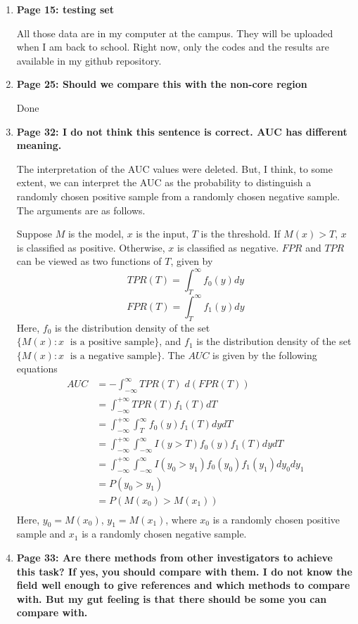 \documentclass[11pt]{article}
\begin{document}
\begin{enumerate}
\item \textbf{Page 15: testing set}

All those data are in my computer at the campus. They will be uploaded when I am back to school. Right now, only the codes and the results are available in my github repository.

\item \textbf{Page 25: Should we compare this with the non-core region}

 Done
 
\item \textbf{Page 32: I do not think this sentence is correct. AUC has different meaning.}

The interpretation of the AUC values were deleted. But, I think, to some extent, we can interpret the AUC as the probability to distinguish a randomly chosen positive sample from a randomly chosen negative sample. The arguments are as follows.

Suppose $M$ is the model, $x$ is the input, $T$ is the threshold. If $M(x)>T$, $x$ is classified as positive. Otherwise, $x$ is classified as negative. $FPR$ and $TPR$ can be viewed as two functions of $T$, given by 
$$TPR(T)=\int_{T}^{\infty}f_0(y)dy$$
$$FPR(T)=\int_{T}^{\infty}f_1(y)dy$$
Here, $f_0$ is the distribution density of the set $\{M(x): x\; \text{ is a positive sample}\}$, and $f_1$ is the distribution density of the set $\{M(x): x\; \text{ is a negative sample}\}$.
The $AUC$ is given by the following equations
\begin{align*}
AUC &= -\int_{-\infty}^{\infty}TPR(T)\; d(FPR(T))\\
	&= \int_{-\infty}^{+\infty}TPR(T)f_1(T)dT\\
	&= \int_{-\infty}^{+\infty}\int_{T}^{\infty}f_0(y)f_1(T)dydT\\
	&= \int_{-\infty}^{+\infty}\int_{-\infty}^{\infty}I(y>T)f_0(y)f_1(T)dydT\\
	&= \int_{-\infty}^{+\infty}\int_{-\infty}^{\infty}I(y_0>y_1)f_0(y_0)f_1(y_1)dy_0dy_1\\
	&= P(y_0>y_1)\\
	&= P(M(x_0)>M(x_1))\\
\end{align*}
Here, $y_0=M(x_0)$, $y_1=M(x_1)$, where $x_0$ is a randomly chosen positive sample and $x_1$ is a randomly chosen negative sample. 

\item \textbf{Page 33: Are there methods from other investigators to achieve this task? If yes, you should compare with them. I do not know the field well enough to give references and which methods to compare with. But my gut feeling is that there should be some you can compare with.}
 


\end{enumerate}
\end{document}
